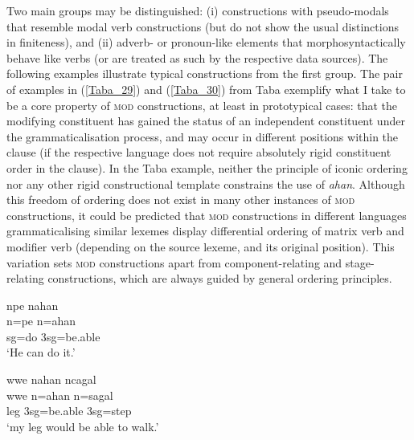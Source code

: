 Two main groups may be distinguished: (i) constructions with pseudo-modals that resemble modal verb constructions (but do not show the usual distinctions in finiteness), and (ii) adverb- or pronoun-like elements that morphosyntactically behave like verbs (or are treated as such by the respective data sources). The following examples illustrate typical constructions from the first group. The pair of examples in (\ref{Taba_29}) and (\ref{Taba_30}) from Taba exemplify what I take to be a core property of \textsc{mod} constructions, at least in prototypical cases: that the modifying constituent has gained the status of an independent constituent under the grammaticalisation process, and may occur in different positions within the clause (if the respective language does not require absolutely rigid constituent order in the clause). In the Taba example, neither the principle of iconic ordering nor any other rigid constructional template constrains the use of \textit{ahan}. Although this freedom of ordering does not exist in many other instances of \textsc{mod} constructions, it could be predicted that \textsc{mod} constructions in different languages grammaticalising similar lexemes display differential ordering of matrix verb and modifier verb (depending on the source lexeme, and its original position). This variation sets \textsc{mod} constructions apart from component-relating and stage-relating constructions, which are always guided by general ordering principles.

\ea \label{Taba_29}
\gll npe nahan \\
n=pe n=ahan \\
\acs{sg}=do 3\acs{sg}=be.able \\
\glft `He can do it.' \\ 
\z
\xe

\ea \label{Taba_30}
\gll wwe nahan ncagal \\
wwe n=ahan n=sagal \\
\glc leg 3\acs{sg}=be.able 3\acs{sg}=step \\
\glft `my leg would be able to walk.' \\ 
\z
\xe

